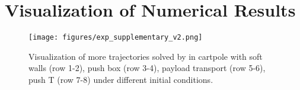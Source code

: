 \newpage
\section{Visualization of Numerical Results}\label{app:additional-numerical-result-visualize}
\begin{figure*}[h] 
    \centering
    \texttt{[image: figures/exp\_supplementary\_v2.png]}
    \caption{Visualization of more trajectories solved by \crisp in cartpole with soft walls (row 1-2), push box (row 3-4), payload transport (row 5-6), push T (row 7-8) under different initial conditions.}
    \label{fig:exp}
\end{figure*}



